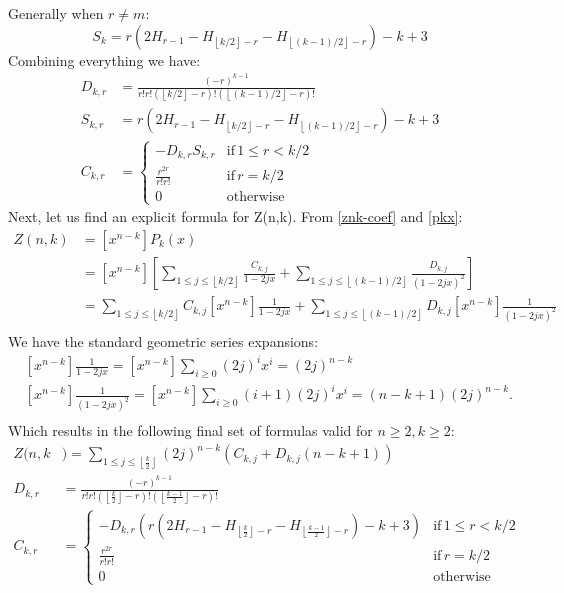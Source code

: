 \documentclass{article}
\newcommand{\floor}[1]{\left\lfloor #1 \right\rfloor}
\begin{document}
Generally when $r \neq m$:
\begin{equation}\label{s-k}
    S_k = r(2H_{r-1}-H_{\floor{k/2}-r}-H_{\floor{(k-1)/2}-r})-k+3
\end{equation}
Combining everything we have:
\begin{equation}\label{d-s-c}
    \begin{aligned}
        D_{k,r} &= \frac{(-r)^{k-1}}{r!r!(\floor{k/2}-r)!(\floor{(k-1)/2}-r)!} \\
        S_{k,r} &= r(2H_{r-1}-H_{\floor{k/2}-r}-H_{\floor{(k-1)/2}-r})-k+3 \\
        C_{k,r} &= 
        \begin{cases}
            - D_{k,r} S_{k,r} & \text{if}\, 1 \leq r < k/2\\
            \frac{r^{2r}}{r!r!} & \text{if}\, r = k/2\\
            0 & \text{otherwise}
        \end{cases} 
    \end{aligned}
\end{equation}
Next, let us find an explicit formula for Z(n,k). From \ref{znk-coef} and \ref{pkx}:
$$
\begin{aligned}
    Z(n,k) &=[x^{n-k}]P_k(x) \\
    &= [x^{n-k}]\left[ \sum_{1 \leq j \leq \floor{k/2}} \frac{C_{k,j}}{1-2jx} + \sum_{1 \leq j \leq \floor{(k-1)/2}} \frac{D_{k,j}}{(1-2jx)^2} \right]\\
     &= \sum_{1 \leq j \leq \floor{k/2}}C_{k,j}[x^{n-k}]  \frac{1}{1-2jx} + \sum_{1 \leq j \leq \floor{(k-1)/2}} D_{k,j}[x^{n-k}]\frac{1}{(1-2jx)^2} \\ 
\end{aligned}
$$
We have the standard geometric series expansions:
$$
\begin{aligned}
     & [x^{n-k}]\frac{1}{1-2jx} = [x^{n-k}]\sum_{i\geq0}(2j)^ix^i = (2j)^{n-k}\\ 
     & [x^{n-k}]\frac{1}{(1-2jx)^2} = [x^{n-k}]\sum_{i\geq0}(i+1)(2j)^ix^i = (n-k+1)(2j)^{n-k}.\\ 
\end{aligned}
$$
Which results in the following final set of formulas valid for $n \geq 2, k \geq 2$:
\begin{equation}
    \begin{aligned}
        Z(n,k &)= \sum_{1 \leq j \leq \floor{\frac{k}{2}}}(2j)^{n-k}\left (C_{k,j} +D_{k,j}(n-k+1) \right )\\
            D_{k,r} &= \frac{(-r)^{k-1}}{r!r!(\floor{\frac{k}{2}}-r)!(\floor{\frac{k-1}{2}}-r)!} \\
            C_{k,r} &= \begin{cases}
                - D_{k,r} (r(2H_{r-1}-H_{\floor{\frac{k}{2}}-r}-H_{\floor{\frac{k-1}{2}}-r})-k+3) & \text{if} \, 1 \leq r < k/2\\
                \frac{r^{2r}}{r!r!} & \text{if}  \, r = k/2\\
                0 & \text{otherwise}
            \end{cases} 
    \end{aligned}
\end{equation}
\printbibliography
\end{document}
